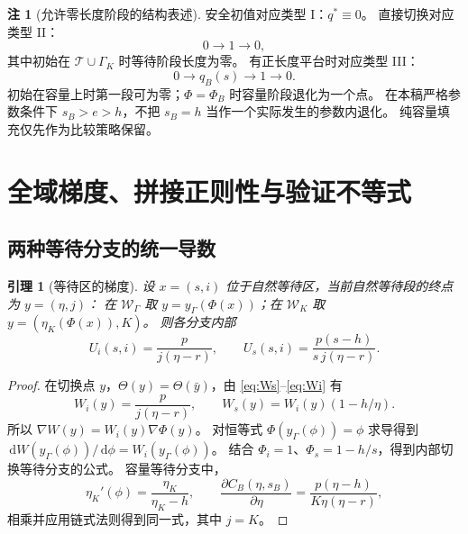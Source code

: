 \documentclass[11pt,a4paper,UTF8]{ctexart}
\newtheorem{lemma}[theorem]{引理}
\theoremstyle{definition}
\newtheorem{remark}[theorem]{注}
\newcommand{\dd}{\,\mathrm d}
\begin{document}
\begin{remark}[允许零长度阶段的结构表述]
安全初值对应类型 I：$q^*\equiv0$。
直接切换对应类型 II：
\begin{equation}
0\longrightarrow1\longrightarrow0,
\label{eq:direct-structure}
\end{equation}
其中初始在 $\mathcal T\cup\Gamma_K$ 时等待阶段长度为零。
有正长度平台时对应类型 III：
\begin{equation}
0\longrightarrow q_B(s)\longrightarrow1\longrightarrow0.
\label{eq:capacity-structure}
\end{equation}
初始在容量上时第一段可为零；$\Phi=\Phi_B$ 时容量阶段退化为一个点。
在本稿严格参数条件下 $s_B>e>h$，不把 $s_B=h$ 当作一个实际发生的参数内退化。
纯容量填充仅先作为比较策略保留。
\end{remark}

\section{全域梯度、拼接正则性与验证不等式}
\label{sec:verification-details}
\subsection{两种等待分支的统一导数}
\begin{lemma}[等待区的梯度]
\label{lem:waiting-gradient}
设 $x=(s,i)$ 位于自然等待区，当前自然等待段的终点为 $y=(\eta,j)$：
在 $\mathcal W_\Gamma$ 取 $y=y_\Gamma(\Phi(x))$；在 $\mathcal W_K$ 取 $y=(\eta_K(\Phi(x)),K)$。
则各分支内部
\begin{equation}
U_i(s,i)=\frac{p}{j(\eta-r)},\qquad
U_s(s,i)=\frac{p(s-h)}{s\,j(\eta-r)}.
\label{eq:waiting-gradient}
\end{equation}
\end{lemma}
\begin{proof}
在切换点 $y$，$\Theta(y)=\Theta(\bar y)$，由 \eqref{eq:Ws}--\eqref{eq:Wi} 有
\[
W_i(y)=\frac p{j(\eta-r)},\qquad
W_s(y)=W_i(y)(1-h/\eta).
\]
所以 $\nabla W(y)=W_i(y)\nabla\Phi(y)$。
对恒等式 $\Phi(y_\Gamma(\phi))=\phi$ 求导得到
$\dd W(y_\Gamma(\phi))/\dd\phi=W_i(y_\Gamma(\phi))$。
结合 $\Phi_i=1$、$\Phi_s=1-h/s$，得到内部切换等待分支的公式。
容量等待分支中，
\[
\eta_K'(\phi)=\frac{\eta_K}{\eta_K-h},\qquad
\frac{\partial C_B(\eta,s_B)}{\partial\eta}
=\frac{p(\eta-h)}{K\eta(\eta-r)},
\]
相乘并应用链式法则得到同一式，其中 $j=K$。
\end{proof}
\end{document}
